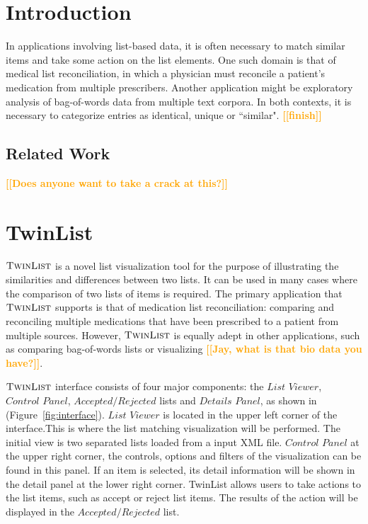 \documentclass{chi2009}
\newcommand{\todo}[1]{\textsf{\textbf{\textcolor{Orange}{[[#1]]}}}}
\newcommand{\TwinList}{\textsc{TwinList}}
\newcommand{\ListViewer}{\textit{List Viewer}}
\newcommand{\AcceptedRejected}{\textit{Accepted/Rejected}}
\newcommand{\Controls}{\textit{Control Panel}}
\newcommand{\Details}{\textit{Details Panel}}
\begin{document}


\section{Introduction}
In applications involving list-based data, it is often necessary to match similar items and take some action on the list elements. One such domain is that of medical list reconciliation, in which a physician must reconcile a patient's medication from multiple prescribers. Another application might be exploratory analysis of bag-of-words data from multiple text corpora. In both contexts, it is necessary to categorize entries as identical, unique or ``similar". \todo{finish}

\subsection{Related Work}
\todo{Does anyone want to take a crack at this?}

\section{TwinList}
$\TwinList$ is a novel list visualization tool for the purpose of illustrating the similarities and differences between two lists. It can be used in many cases where the comparison of two lists of items is required. The primary application that $\TwinList$ supports is that of medication list reconciliation: comparing and reconciling multiple medications that have been prescribed to a patient from multiple sources\cite{JCAHO-2006}. However, $\TwinList$ is equally adept in other applications, such as comparing bag-of-words lists or visualizing \todo{Jay, what is that bio data you have?}. 

$\TwinList$ interface consists of four major components: the $\ListViewer$, $\Controls$, $\AcceptedRejected$ lists and $\Details$, as shown in (Figure~\ref{fig:interface}). $\ListViewer$ is located in the upper left corner of the interface.This is where the list matching visualization will be performed. The initial view is two separated lists loaded from a input XML file.  $\Controls$ at the upper right corner, the controls, options and filters of the visualization can be found in this panel. If an item is selected, its detail information will be shown in the detail panel at the lower right corner. TwinList allows users to take actions to the list items, such as accept or reject list items. The results of the action will be displayed in the $\AcceptedRejected$ list. 
\end{document}
